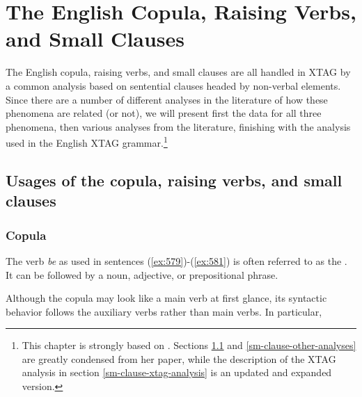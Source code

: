 \chapter{The English Copula, Raising Verbs, and Small Clauses} 
\label{small-clauses} 
 
The English copula, raising verbs, and small clauses are all handled in XTAG by 
a common analysis based on sentential clauses headed by non-verbal elements. 
Since there are a number of different analyses in the literature of how these 
phenomena are related (or not), we will present first the data for all three 
phenomena, then various analyses from the literature, finishing with the 
analysis used in the English XTAG grammar.\footnote{This chapter is strongly based on \cite{heycock91}.  Sections \ref{sm-clause-data} and \ref{sm-clause-other-analyses} are greatly condensed from her paper, while the description of the XTAG analysis in section \ref{sm-clause-xtag-analysis} is an updated and expanded version.} 
 
 
\section{Usages of the copula, raising verbs, and small clauses} 
\label{sm-clause-data} 
 
\subsection{Copula} 
\label{copula-data} 
 
The verb {\it be} as used in sentences ({\ref{ex:579}})-({\ref{ex:581}}) is often 
referred to as the .  It can be followed by a noun, adjective, or 
prepositional phrase. 
 
\beginsentences
{}\label{ex:579} 
\label{ex:580} 
\label{ex:581} 
\endsentences

 
Although the copula may look like a main verb at first glance, its syntactic 
behavior follows the auxiliary verbs rather than main verbs.  In particular, 
 
